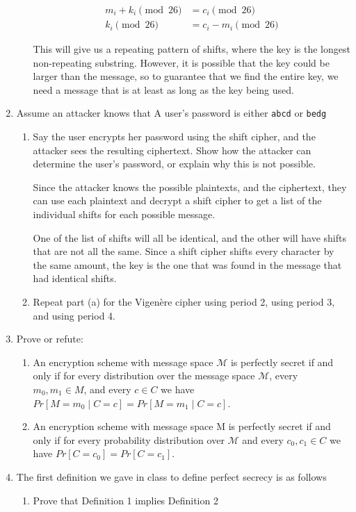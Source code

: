 \documentclass{article}
\begin{document}
\begin{enumerate}
\begin{enumerate}
        \begin{align*}
          m_i + k_i \pmod{26} &= c_i \pmod{26}\\
          k_i \pmod{26} &= c_i - m_i \pmod{26}
        \end{align*}

        This will give us a repeating pattern of shifts, where the key is the
        longest non-repeating substring. However, it is possible that the key
        could be larger than the message, so to guarantee that we find the
        entire key, we need a message that is at least as long as the key being
        used.
    \end{enumerate}

  \item Assume an attacker knows that A user's password is either
    \verb|abcd| or \verb|bedg|
    \begin{enumerate}
      \item Say the user encrypts her password using the shift cipher, and the 
        attacker sees the resulting ciphertext. Show how the attacker can 
        determine the user’s password, or explain why this is not possible.

        Since the attacker knows the possible plaintexts, and the ciphertext,
        they can use each plaintext and decrypt a shift cipher to get a list of
        the individual shifts for each possible message.

        One of the list of shifts will all be identical, and the other will have
        shifts that are not all the same. Since a shift cipher shifts every
        character by the same amount, the key is the one that was found in the
        message that had identical shifts.

      \item Repeat part (a) for the Vigen\`ere cipher using period 2, using 
        period 3, and using period 4.
    \end{enumerate}
  \item Prove or refute:
    \begin{enumerate}
      \item An encryption scheme with message space $\mathcal{M}$ is perfectly
        secret if and only if for every distribution over the message space 
        $\mathcal{M}$, every $m_0, m_1 \in M$, and every $c \in C$ we have 
        $Pr\left[M = m_0 \mid C = c\right] = Pr\left[M = m_1 \mid C = c\right]$.

      \item An encryption scheme with message space M is perfectly secret if and 
        only if for every probability distribution over $\mathcal{M}$ and every
        $c_0, c_1 \in C$ 
        we have $Pr\left[C = c_0\right] = Pr\left[C = c_1\right]$.
    \end{enumerate}
  \item The first definition we gave in class to define perfect secrecy is as follows
    \begin{enumerate}
      \item Prove that Definition 1 implies Definition 2


\end{enumerate}
\end{enumerate}
\end{document}
